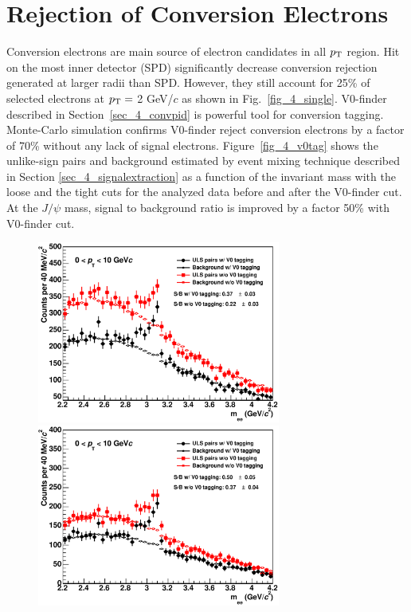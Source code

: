 {\section{Rejection of Conversion Electrons}
\label{sec_4_convref}
Conversion electrons are main source of electron candidates in all $p_{\rm{T}}$ region.
Hit on the most inner detector (SPD) significantly decrease conversion rejection generated at larger radii than SPD.
However, they still account for 25\% of selected electrons at $p_{\rm{T}} =$ 2 GeV/$c$ as shown in Fig.~\ref{fig_4_single}.  
V0-finder described in Section~\ref{sec_4_convpid} is powerful tool for conversion tagging. 
Monte-Carlo simulation confirms V0-finder reject conversion electrons by a factor of 70\% without any lack of signal electrons. 
Figure~\ref{fig_4_v0tag} shows the unlike-sign pairs and background estimated by event mixing technique described in Section  \ref{sec_4_signalextraction} as a function of the invariant mass with the loose and the tight cuts for the analyzed data before and after the V0-finder cut.
At the $J/\psi$ mass, signal to background ratio is improved by a factor 50\% with V0-finder cut. 
\begin{figure}[htbp]
 \begin{minipage}{0.5\hsize}
  \begin{center}
  \includegraphics[width=8cm]{chap4/figure/V0tag/V0tagCheck_MB_cut7.eps}
  \end{center}
 \end{minipage}
 \begin{minipage}{0.5\hsize}
  \begin{center}
  \includegraphics[width=8cm]{chap4/figure/V0tag/V0tagCheck_MB_cut40.eps}

\end{center}
\end{minipage}
\end{figure}}
